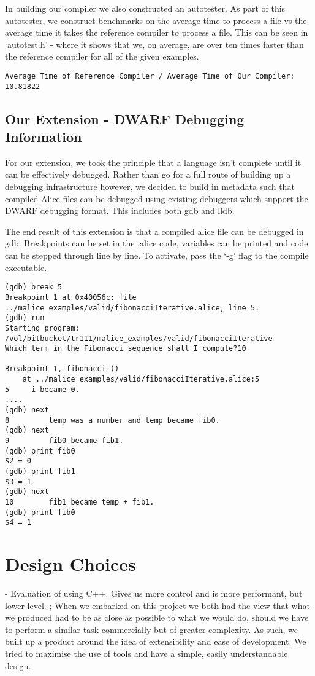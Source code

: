 \documentclass[a4wide, 11pt]{article}
\begin{document}
In building our compiler we also constructed an autotester. As part of this autotester, we construct benchmarks on the average time to process a file vs the average time it takes the reference compiler to process a file. This can be seen in `autotest.h' - where it shows that we, on average, are over ten times faster than the reference compiler for all of the given examples.
\begin{verbatim}
Average Time of Reference Compiler / Average Time of Our Compiler: 10.81822
\end{verbatim}

\subsection{Our Extension - DWARF Debugging Information}

For our extension, we took the principle that a language isn't complete until it can be effectively debugged. Rather than go for a full route of building up a debugging infrastructure however, we decided to build in metadata such that compiled Alice files can be debugged using existing debuggers which support the DWARF debugging format. This includes both gdb and lldb.

The end result of this extension is that a compiled alice file can be debugged in gdb. Breakpoints can be set in the .alice code, variables can be printed and code can be stepped through line by line. To activate, pass the `-g' flag to the compile executable.

\begin{verbatim}
(gdb) break 5
Breakpoint 1 at 0x40056c: file ../malice_examples/valid/fibonacciIterative.alice, line 5.
(gdb) run
Starting program: /vol/bitbucket/tr111/malice_examples/valid/fibonacciIterative 
Which term in the Fibonacci sequence shall I compute?10

Breakpoint 1, fibonacci ()
    at ../malice_examples/valid/fibonacciIterative.alice:5
5     i became 0.
....
(gdb) next
8         temp was a number and temp became fib0.
(gdb) next
9         fib0 became fib1.
(gdb) print fib0
$2 = 0
(gdb) print fib1
$3 = 1
(gdb) next
10        fib1 became temp + fib1.
(gdb) print fib0
$4 = 1
\end{verbatim}

\section{Design Choices}

- Evaluation of using C++. Gives us more control and is more performant, but lower-level.
;
When we embarked on this project we both had the view that what we produced had to be as close as possible to what we would do, should we have to perform a similar task commercially but of greater complexity. As such, we built up a product around the idea of extensibility and ease of development. We tried to maximise the use of tools and have a simple, easily understandable design.
\end{document}
